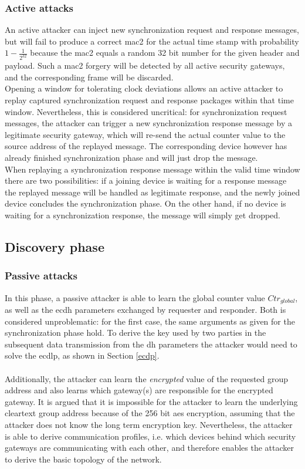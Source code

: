\subsubsection{Active attacks}
An active attacker can inject new synchronization request and response messages, but will fail to produce a correct \gls{mac2} for the actual time stamp with probability
$1-\frac{1}{2^{32}}$ because
the \gls{mac2} equals a random 32 bit number for the given header and payload. Such a \gls{mac2} forgery will be detected by all active security gateways,
and the corresponding frame will be discarded. 
\\
Opening a window for tolerating clock deviations allows an active attacker to replay captured synchronization request and response packages within that time window.
Nevertheless, this is considered uncritical: for synchronization request messages, the attacker can trigger a new synchronization response message by a legitimate security gateway, which
will re-send the actual counter value to the source address of the replayed message. The corresponding device however has already finished synchronization phase and will just drop
the message.
\\
When replaying a synchronization response message within the valid time window there are two possibilities: if a joining device is waiting for a response message the replayed message
will be handled as legitimate response, and the newly joined device concludes the synchronization phase. On the other hand, if no device is waiting for a synchronization response,
the message will simply get dropped.

\subsection{Discovery phase}
\subsubsection{Passive attacks}
In this phase, a passive attacker is able to learn the global counter value $Ctr_{global}$, as well as the \gls{ecdh} parameters exchanged by requester and responder.
Both is considered unproblematic: for the first case, the same arguments as given for the synchronization phase hold. To derive the key used by two parties in the subsequent
data transmission from the \gls{dh} parameters the attacker would need to solve the \gls{ecdlp}, as shown in Section \ref{ecdp}.
\\
\\
Additionally, the attacker can learn 
the \textit{encrypted} value of the requested group address and also learns which gateway(s) are responsible for the encrypted gateway. It is argued that it is impossible for the
attacker to learn the underlying cleartext group address because of the 256 bit \gls{aes} encryption, assuming that the attacker does not know the long term encryption key.
Nevertheless, the attacker is able to derive communication profiles, i.e.
which devices behind which security gateways are communicating with each other, and therefore enables the attacker to derive the basic topology of the network.

